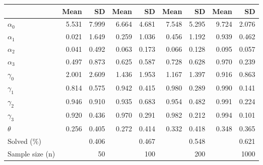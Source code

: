 
\begin{tabular}[t]{lrrrrrrrr}
\toprule
  & Mean & SD & Mean  & SD  & Mean   & SD   & Mean    & SD   \\
\midrule
$\alpha_{0}$ & 5.531 & 7.999 & 6.664 & 4.681 & 7.548 & 5.295 & 9.724 & 2.076\\
$\alpha_{1}$ & 0.021 & 1.649 & 0.259 & 1.036 & 0.456 & 1.192 & 0.939 & 0.462\\
$\alpha_{2}$ & 0.041 & 0.492 & 0.063 & 0.173 & 0.066 & 0.128 & 0.095 & 0.057\\
$\alpha_{3}$ & 0.497 & 0.873 & 0.625 & 0.587 & 0.728 & 0.628 & 0.970 & 0.239\\
$\gamma_{0}$ & 2.001 & 2.609 & 1.436 & 1.953 & 1.167 & 1.397 & 0.916 & 0.863\\
$\gamma_{1}$ & 0.814 & 0.575 & 0.942 & 0.415 & 0.980 & 0.289 & 0.990 & 0.141\\
$\gamma_{2}$ & 0.946 & 0.910 & 0.935 & 0.683 & 0.954 & 0.482 & 0.991 & 0.224\\
$\gamma_{3}$ & 0.920 & 0.436 & 0.970 & 0.291 & 0.982 & 0.212 & 0.994 & 0.101\\
$\theta$ & 0.256 & 0.405 & 0.272 & 0.414 & 0.332 & 0.418 & 0.348 & 0.365\\
Solved (\%) &  & 0.406 &  & 0.467 &  & 0.548 &  & 0.621\\
Sample size (n) &  & 50 &  & 100 &  & 200 &  & 1000\\
\bottomrule
\end{tabular}
